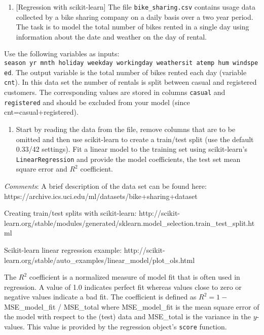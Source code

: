 \documentclass[11pt]{article}
\providecommand{\tightlist}{%
      \setlength{\itemsep}{0pt}\setlength{\parskip}{0pt}}
\begin{document}
    \begin{enumerate}
\def\labelenumi{\arabic{enumi})}
\setcounter{enumi}{3}
\tightlist
\item
  {[}Regression with scikit-learn{]} The file \texttt{bike\_sharing.csv}
  contains usage data collected by a bike sharing company on a daily
  basis over a two year period. The task is to model the total number of
  bikes rented in a single day using information about the date and
  weather on the day of rental.
\end{enumerate}

Use the following variables as inputs:
\texttt{season\ yr\ mnth\ holiday\ weekday\ workingday\ weathersit\ atemp\ hum\ windspeed}.
The output variable is the total number of bikes rented each day
(variable \texttt{cnt}). In this data set the number of rentals is split
between casual and registered customers. The corresponding values are
stored in columns \texttt{casual} and \texttt{registered} and should be
excluded from your model (since cnt=casual+registered).

\begin{enumerate}
\def\labelenumi{\alph{enumi})}
\tightlist
\item
  Start by reading the data from the file, remove columns that are to be
  omitted and then use scikit-learn to create a train/test split (use
  the default 0.33/42 settings). Fit a linear model to the training set
  using scikit-learn's \texttt{LinearRegression} and provide the model
  coefficients, the test set mean square error and \(R^2\) coefficient.
\end{enumerate}

\emph{Comments}: A brief description of the data set can be found here:
https://archive.ics.uci.edu/ml/datasets/bike+sharing+dataset

Creating train/test splits with scikit-learn:
http://scikit-learn.org/stable/modules/generated/sklearn.model\_selection.train\_test\_split.html

Scikit-learn linear regression example:
http://scikit-learn.org/stable/auto\_examples/linear\_model/plot\_ols.html

The \(R^2\) coefficient is a normalized measure of model fit that is
often used in regression. A value of 1.0 indicates perfect fit whereas
values close to zero or negative values indicate a bad fit. The
coefficient is defined as \(R^2=1-\)MSE\_model\_fit / MSE\_total where
MSE\_model\_fit is the mean square error of the model with respect to
the (test) data and MSE\_total is the variance in the \(y\)-values. This
value is provided by the regression object's \texttt{score} function.
\end{document}
